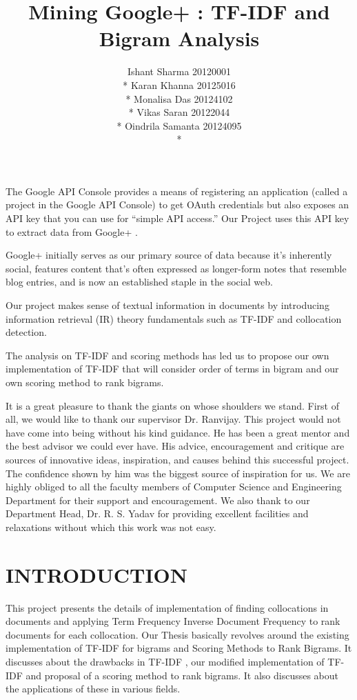 \documentclass{mnnit}
\begin{document}
\title{Mining Google+ : TF-IDF and Bigram Analysis}
\author{Ishant Sharma 20120001\\* Karan Khanna 20125016\\*  Monalisa Das 20124102\\*  Vikas Saran 20122044 \\* Oindrila Samanta 20124095 \\*}

\beforepreface
{}

\noindent The Google API Console provides a means of registering an application (called a project in the Google API Console) to get OAuth credentials but also
exposes an API key that you can use for “simple API access.” Our Project uses this API key to extract data from Google+ .

\noindent Google+ initially serves as our primary source of data  because it’s inherently social, features content that’s often expressed as longer-form notes that resemble blog entries, and is now an established staple in the social web.

\noindent Our project makes sense of textual information in documents by introducing information retrieval (IR) theory fundamentals such as TF-IDF and collocation detection.

\noindent The analysis on TF-IDF and scoring methods has led us to propose our own implementation of TF-IDF that will consider order of terms in bigram and our own scoring method to rank bigrams.


   It is a great pleasure to thank the giants on whose shoulders we stand. First of all, we would like to thank our supervisor Dr. Ranvijay. This project would not have come into being without his kind guidance. He has been a great mentor and the best advisor we could ever have. His advice, encouragement and critique are sources of innovative ideas, inspiration, and causes behind this successful project. The confidence shown by him was the biggest source of inspiration for us. We are highly obliged to all the faculty members of Computer Science and Engineering Department for their support and encouragement. We also thank to our Department Head, Dr. R. S. Yadav for providing excellent facilities and relaxations without which this work was not easy.

\afterpreface

\chapter{INTRODUCTION}
This project presents the details of implementation of finding collocations in documents and applying Term Frequency Inverse Document Frequency to rank documents for each collocation.
Our Thesis basically revolves around the existing implementation of TF-IDF for bigrams and Scoring Methods to Rank Bigrams.
It discusses about the drawbacks in TF-IDF , our modified implementation of TF-IDF and proposal of a scoring method to rank bigrams.
It also discusses about the applications of these in various fields.
\end{document}
